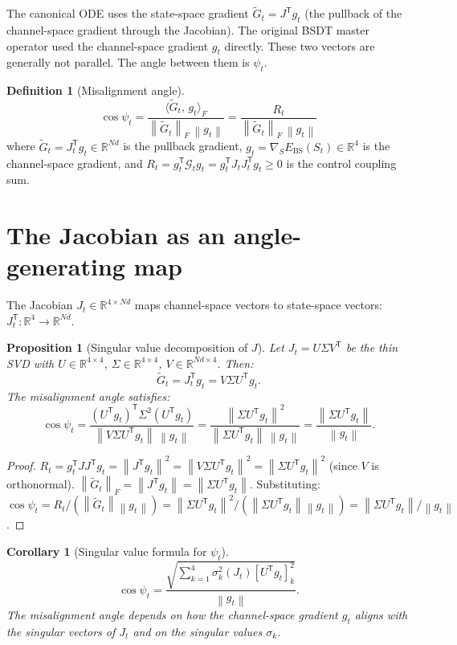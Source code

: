 \documentclass[11pt,a4paper,openany]{book}
\newtheorem{proposition}[theorem]{Proposition}
\newtheorem{corollary}[theorem]{Corollary}
\theoremstyle{definition}
\newtheorem{definition}[theorem]{Definition}
\newcommand{\R}{\mathbb{R}}
\newcommand{\T}{^{\mathsf{T}}}
\newcommand{\norm}[1]{\left\|#1\right\|}
\newcommand{\inner}[2]{\langle #1,\,#2\rangle}
\begin{document}
The canonical ODE uses the state-space gradient $\tilde G_t = J\T g_t$ (the pullback of the
channel-space gradient through the Jacobian). The original BSDT master operator used the
channel-space gradient $g_t$ directly. These two vectors are generally not parallel.
The angle between them is $\psi_t$.

\begin{definition}[Misalignment angle]
\label{def:psi}
\[
\cos\psi_t = \frac{\inner{\tilde G_t}{g_t}_F}{\norm{\tilde G_t}_F\,\norm{g_t}}
= \frac{R_t}{\norm{\tilde G_t}_F\,\norm{g_t}}
\]
where $\tilde G_t = J_t\T g_t \in \R^{Nd}$ is the pullback gradient,
$g_t = \nabla_S E_\mathrm{BS}(S_t) \in \R^4$ is the channel-space gradient, and
$R_t = g_t\T \mathcal{G}_t g_t = g_t\T J_t J_t\T g_t \geq 0$ is the control coupling sum.
\end{definition}

\section{The Jacobian as an angle-generating map}

The Jacobian $J_t \in \R^{4\times Nd}$ maps channel-space vectors to state-space vectors:
$J_t\T : \R^4 \to \R^{Nd}$.

\begin{proposition}[Singular value decomposition of $J$]
Let $J_t = U\Sigma V\T$ be the thin SVD with $U \in \R^{4\times 4}$, $\Sigma \in \R^{4\times 4}$,
$V \in \R^{Nd\times 4}$. Then:
\[
\tilde G_t = J_t\T g_t = V\Sigma U\T g_t.
\]
The misalignment angle satisfies:
\[
\cos\psi_t = \frac{(U\T g_t)\T\Sigma^2(U\T g_t)}{\norm{V\Sigma U\T g_t}\,\norm{g_t}}
= \frac{\norm{\Sigma U\T g_t}^2}{\norm{\Sigma U\T g_t}\,\norm{g_t}}
= \frac{\norm{\Sigma U\T g_t}}{\norm{g_t}}.
\]
\end{proposition}

\begin{proof}
$R_t = g_t\T JJ\T g_t = \norm{J\T g_t}^2 = \norm{V\Sigma U\T g_t}^2 = \norm{\Sigma U\T g_t}^2$
(since $V$ is orthonormal).
$\norm{\tilde G_t}_F = \norm{J\T g_t} = \norm{\Sigma U\T g_t}$.
Substituting: $\cos\psi_t = R_t/(\norm{\tilde G_t}\norm{g_t}) = \norm{\Sigma U\T g_t}^2/(\norm{\Sigma U\T g_t}\norm{g_t}) = \norm{\Sigma U\T g_t}/\norm{g_t}$.
\end{proof}

\begin{corollary}[Singular value formula for $\psi_t$]
\[
\cos\psi_t = \frac{\sqrt{\sum_{k=1}^4 \sigma_k^2(J_t)[U\T g_t]_k^2}}{\norm{g_t}}.
\]
The misalignment angle depends on how the channel-space gradient $g_t$ aligns
with the singular vectors of $J_t$ and on the singular values $\sigma_k$.
\end{corollary}
\end{document}
